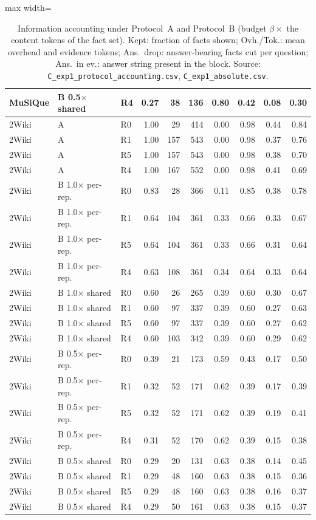 \begin{table}[t]
\begin{adjustbox}{max width=\linewidth}
\begin{tabular}{@{}lllrrrrrrr@{}}
MuSiQue & B 0.5$\times$ shared & R4 & 0.27 & 38 & 136 & 0.80 & 0.42 & 0.08 & 0.30 \\
\midrule
2Wiki & A & R0 & 1.00 & 29 & 414 & 0.00 & 0.98 & 0.44 & 0.84 \\
2Wiki & A & R1 & 1.00 & 157 & 543 & 0.00 & 0.98 & 0.37 & 0.76 \\
2Wiki & A & R5 & 1.00 & 157 & 543 & 0.00 & 0.98 & 0.38 & 0.70 \\
2Wiki & A & R4 & 1.00 & 167 & 552 & 0.00 & 0.98 & 0.41 & 0.69 \\
2Wiki & B 1.0$\times$ per-rep. & R0 & 0.83 & 28 & 366 & 0.11 & 0.85 & 0.38 & 0.78 \\
2Wiki & B 1.0$\times$ per-rep. & R1 & 0.64 & 104 & 361 & 0.33 & 0.66 & 0.33 & 0.67 \\
2Wiki & B 1.0$\times$ per-rep. & R5 & 0.64 & 104 & 361 & 0.33 & 0.66 & 0.31 & 0.64 \\
2Wiki & B 1.0$\times$ per-rep. & R4 & 0.63 & 108 & 361 & 0.34 & 0.64 & 0.33 & 0.64 \\
2Wiki & B 1.0$\times$ shared & R0 & 0.60 & 26 & 265 & 0.39 & 0.60 & 0.30 & 0.67 \\
2Wiki & B 1.0$\times$ shared & R1 & 0.60 & 97 & 337 & 0.39 & 0.60 & 0.27 & 0.63 \\
2Wiki & B 1.0$\times$ shared & R5 & 0.60 & 97 & 337 & 0.39 & 0.60 & 0.27 & 0.62 \\
2Wiki & B 1.0$\times$ shared & R4 & 0.60 & 103 & 342 & 0.39 & 0.60 & 0.29 & 0.62 \\
2Wiki & B 0.5$\times$ per-rep. & R0 & 0.39 & 21 & 173 & 0.59 & 0.43 & 0.17 & 0.50 \\
2Wiki & B 0.5$\times$ per-rep. & R1 & 0.32 & 52 & 171 & 0.62 & 0.39 & 0.17 & 0.39 \\
2Wiki & B 0.5$\times$ per-rep. & R5 & 0.32 & 52 & 171 & 0.62 & 0.39 & 0.19 & 0.41 \\
2Wiki & B 0.5$\times$ per-rep. & R4 & 0.31 & 52 & 170 & 0.62 & 0.39 & 0.15 & 0.38 \\
2Wiki & B 0.5$\times$ shared & R0 & 0.29 & 20 & 131 & 0.63 & 0.38 & 0.14 & 0.45 \\
2Wiki & B 0.5$\times$ shared & R1 & 0.29 & 48 & 160 & 0.63 & 0.38 & 0.15 & 0.36 \\
2Wiki & B 0.5$\times$ shared & R5 & 0.29 & 48 & 160 & 0.63 & 0.38 & 0.16 & 0.37 \\
2Wiki & B 0.5$\times$ shared & R4 & 0.29 & 50 & 161 & 0.63 & 0.38 & 0.15 & 0.37 \\
\bottomrule
\end{tabular}
\end{adjustbox}
\caption{Information accounting under Protocol~A and Protocol~B (budget $\beta\times$ the content tokens of the fact set). Kept: fraction of facts shown; Ovh./Tok.: mean overhead and evidence tokens; Ans.\ drop: answer-bearing facts cut per question; Ans.\ in ev.: answer string present in the block. Source: \texttt{C\_exp1\_protocol\_accounting.csv}, \texttt{C\_exp1\_absolute.csv}.}
\label{tab:budget}
\end{table}
